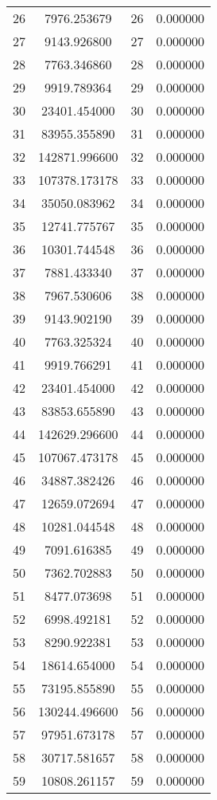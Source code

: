\documentclass[12pt]{article}
\begin{document}
\begin{longtable}{@{}cccc@{}}
26 & 7976.253679 & 26 & 0.000000 \\
27 & 9143.926800 & 27 & 0.000000 \\
28 & 7763.346860 & 28 & 0.000000 \\
29 & 9919.789364 & 29 & 0.000000 \\
30 & 23401.454000 & 30 & 0.000000 \\
31 & 83955.355890 & 31 & 0.000000 \\
32 & 142871.996600 & 32 & 0.000000 \\
33 & 107378.173178 & 33 & 0.000000 \\
34 & 35050.083962 & 34 & 0.000000 \\
35 & 12741.775767 & 35 & 0.000000 \\
36 & 10301.744548 & 36 & 0.000000 \\
37 & 7881.433340 & 37 & 0.000000 \\
38 & 7967.530606 & 38 & 0.000000 \\
39 & 9143.902190 & 39 & 0.000000 \\
40 & 7763.325324 & 40 & 0.000000 \\
41 & 9919.766291 & 41 & 0.000000 \\
42 & 23401.454000 & 42 & 0.000000 \\
43 & 83853.655890 & 43 & 0.000000 \\
44 & 142629.296600 & 44 & 0.000000 \\
45 & 107067.473178 & 45 & 0.000000 \\
46 & 34887.382426 & 46 & 0.000000 \\
47 & 12659.072694 & 47 & 0.000000 \\
48 & 10281.044548 & 48 & 0.000000 \\
49 & 7091.616385 & 49 & 0.000000 \\
50 & 7362.702883 & 50 & 0.000000 \\
51 & 8477.073698 & 51 & 0.000000 \\
52 & 6998.492181 & 52 & 0.000000 \\
53 & 8290.922381 & 53 & 0.000000 \\
54 & 18614.654000 & 54 & 0.000000 \\
55 & 73195.855890 & 55 & 0.000000 \\
56 & 130244.496600 & 56 & 0.000000 \\
57 & 97951.673178 & 57 & 0.000000 \\
58 & 30717.581657 & 58 & 0.000000 \\
59 & 10808.261157 & 59 & 0.000000 \\

\end{longtable}
\end{document}

